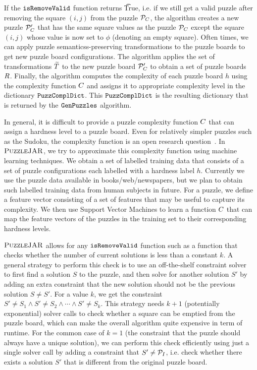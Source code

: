 If the $\texttt{isRemoveValid}$ function returns \t{True}, i.e. if we still
get a valid puzzle after removing the square $(i,j)$ from the puzzle
$\mathcal{P}_C$, the algorithm creates a new puzzle $\mathcal{P}_C'$
that has the same square values as the puzzle $\mathcal{P}_C$ except
the square $(i,j)$ whose value is now set to $\phi$ (denoting an empty
square). Often times, we can apply puzzle semanticss-preserving
transformations to the puzzle boards to get new puzzle board
configurations. The algorithm applies the set of transformations
$\widetilde{T}$ to the new puzzle board $\mathcal{P}_C'$ to
obtain a set of puzzle boards $R$. Finally, the algorithm
computes the complexity of each puzzle board $h$ using the complexity
function $C$ and assigns it to appropriate complexity
level in the dictionary $\texttt{PuzzComplDict}$. This $\texttt{PuzzComplDict}$ is
the resulting dictionary that is returned by the $\texttt{GenPuzzles}$
algorithm.

In general, it is difficult to provide a puzzle complexity function
$C$ that can assign a hardness level to a puzzle
board. Even for relatively simpler puzzles such as the Sudoku, the
complexity function is an open research
question~\cite{sudokuchaos}. In $\textsc{PuzzleJAR}$, we try to approximate
this complexity function using machine learning techniques. We obtain
a set of labelled training data that consists of a set of puzzle
configurations each labelled with a hardness label $h$. Currently we
use the puzzle data available in books/web/newspapers, but we plan to
obtain such labelled training data from human subjects in future. For
a puzzle, we define a feature vector consisting of a set of features
that may be useful to capture its complexity. We then use Support
Vector Machines to learn a function $C$ that can map
the feature vectors of the puzzles in the training set to their
corresponding hardness levels.

$\textsc{PuzzleJAR}$ allows for any $\texttt{isRemoveValid}$ function such as a
function that checks whether the number of current solutions is less
than a constant $k$. A general strategy to perform this check is to
use an off-the-shelf constraint solver to first find a solution $S$ to
the puzzle, and then solve for another solution $S'$ by adding an
extra constraint that the new solution should not be the previous
solution $S \neq S'$. For a value $k$, we get the constraint $S' \neq
S_1 \land S' \neq S_2 \land \cdots \land S' \neq S_k$. This strategy
needs $k+1$ (potentially exponential) solver calls to check whether a
square can be emptied from the puzzle board, which can make the
overall algorithm quite expensive in term of runtime. For the common case of $k=1$ (the
constraint that the puzzle should always have a unique solution), we
can perform this check efficiently using just a single solver call by
adding a constraint that $S' \neq \mathcal{P}_I$, i.e. check whether
there exists a solution $S'$ that is different from the original
puzzle board.
